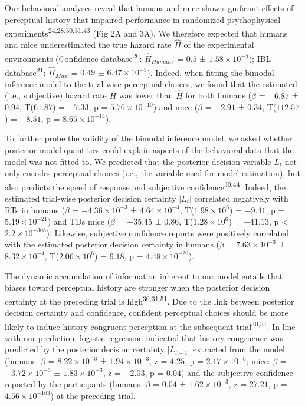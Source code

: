 \documentclass[
]{article}
\begin{document}
Our behavioral analyses reveal that humans and mice show significant
effects of perceptual history that impaired performance in randomized
psychophysical experiments\textsuperscript{24,28,30,31,43} (Fig 2A
and 3A). We therefore expected that humans and mice underestimated the
true hazard rate \(\hat{H}\) of the experimental environments
(Confidence database\textsuperscript{20}: \(\hat{H}_{Humans}\) = \(0.5\)
± \(\ensuremath{1.58\times 10^{-5}}\)); IBL
database\textsuperscript{21}: \(\hat{H}_{Mice}\) = \(0.49\) ±
\(\ensuremath{6.47\times 10^{-5}}\)). Indeed, when fitting the bimodal
inference model to the trial-wise perceptual choices, we found that the
estimated (i.e., subjective) hazard rate \(H\) was lower than
\(\hat{H}\) for both humans (\(\beta\) = \(-6.87\) ± \(0.94\),
T(\(61.87\)) = \(-7.33\), p = \(\ensuremath{5.76\times 10^{-10}}\)) and
mice (\(\beta\) = \(-2.91\) ± \(0.34\), T(\(112.57\)) = \(-8.51\), p =
\(\ensuremath{8.65\times 10^{-14}}\)).

To further probe the validity of the bimodal inference model, we asked
whether posterior model quantities could explain aspects of the
behavioral data that the model was not fitted to. We predicted that the
posterior decision variable \(L_t\) not only encodes perceptual choices
(i.e., the variable used for model estimation), but also predicts the
speed of response and subjective confidence\textsuperscript{30,44}.
Indeed, the estimated trial-wise posterior decision certainty \(|L_t|\)
correlated negatively with RTs in humans (\(\beta\) =
\(\ensuremath{-4.36\times 10^{-3}}\) ±
\(\ensuremath{4.64\times 10^{-4}}\),
T(\(\ensuremath{1.98\times 10^{6}}\)) = \(-9.41\), p =
\(\ensuremath{5.19\times 10^{-21}}\)) and TDs mice (\(\beta\) =
\(-35.45\) ± \(0.86\), T(\(\ensuremath{1.28\times 10^{6}}\)) =
\(-41.13\), p < \(\ensuremath{2.2\times 10^{-308}}\)). Likewise, subjective confidence reports were
positively correlated with the estimated posterior decision certainty in
humans (\(\beta\) = \(\ensuremath{7.63\times 10^{-3}}\) ±
\(\ensuremath{8.32\times 10^{-4}}\),
T(\(\ensuremath{2.06\times 10^{6}}\)) = \(9.18\), p =
\(\ensuremath{4.48\times 10^{-20}}\)).

The dynamic accumulation of information inherent to our model entails
that biases toward perceptual history are stronger when the posterior
decision certainty at the preceding trial is
high\textsuperscript{30,31,51}. Due to the link between posterior
decision certainty and confidence, confident perceptual choices should
be more likely to induce history-congruent perception at the subsequent
trial\textsuperscript{30,31}. In line with our prediction, logistic
regression indicated that history-congruence was predicted by the
posterior decision certainty \(|L_{t-1}|\) extracted from the model
(humans: \(\beta\) = \(\ensuremath{8.22\times 10^{-3}}\) ±
\(\ensuremath{1.94\times 10^{-3}}\), z = \(4.25\), p =
\(\ensuremath{2.17\times 10^{-5}}\); mice: \(\beta\) =
\(\ensuremath{-3.72\times 10^{-3}}\) ±
\(\ensuremath{1.83\times 10^{-3}}\), z = \(-2.03\), p = \(0.04\)) and
the subjective confidence reported by the participants (humans:
\(\beta\) = \(0.04\) ± \(\ensuremath{1.62\times 10^{-3}}\), z =
\(27.21\), p = \(\ensuremath{4.56\times 10^{-163}}\)) at the preceding
trial.
\end{document}
